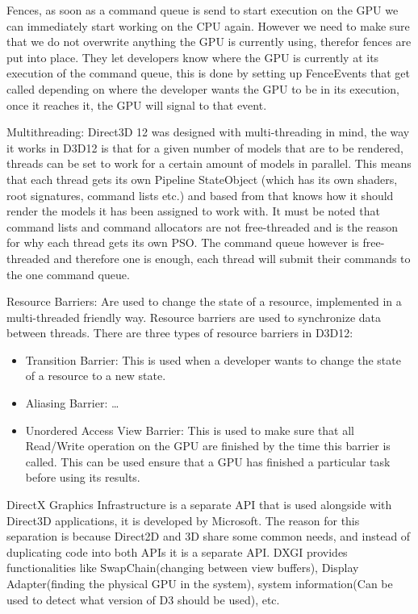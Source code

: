 Fences, as soon as a command queue is send to start execution on the GPU we can immediately start working on the CPU again.
However we need to make sure that we do not overwrite anything the GPU is currently using, therefor fences are put into place.
They let developers know where the GPU is currently at its execution of the command queue, this is done by setting up FenceEvents that get called depending on where the developer wants the GPU to be in its execution, once it reaches it, the GPU will signal to that event. 


Multithreading:
Direct3D 12 was designed with multi-threading in mind, the way it works in D3D12 is that for a given number of models that are to be rendered, threads can be set to work for a certain amount of models in parallel.
This means that each thread gets its own Pipeline StateObject (which has its own shaders, root signatures, command lists etc.) and based from that knows how it should render the models it has been assigned to work with. 
It must be noted that command lists and command allocators are not free-threaded and is the reason for why each thread gets its own \gls{PSO}.
The command queue however is free-threaded and therefore one is enough, each thread will submit their commands to the one command queue.


Resource Barriers: 
Are used to change the state of a resource, implemented in a multi-threaded friendly way. Resource barriers are used to synchronize data between threads.
There are three types of resource barriers in D3D12:

\begin{itemize}
\item Transition Barrier: This is used when a developer wants to change the state of a resource to a new state. 
\item Aliasing Barrier: …
\item Unordered Access View Barrier:  This is used to make sure that all Read/Write operation on the GPU are finished by the time this barrier is called. This can be used ensure that a GPU has finished a particular task before using its results.
\end{itemize}

DirectX Graphics Infrastructure is a separate API that is used alongside with Direct3D applications, it is developed by Microsoft.
The reason for this separation is because Direct2D and 3D share some common needs, and instead of duplicating code into both APIs it is a separate API.
DXGI provides functionalities like SwapChain(changing between view buffers), Display Adapter(finding the physical GPU in the system), system information(Can be used to detect what version of D3 should be used), etc.


